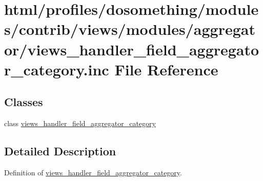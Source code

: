 \hypertarget{views__handler__field__aggregator__category_8inc}{
\section{html/profiles/dosomething/modules/contrib/views/modules/aggregator/views\_\-handler\_\-field\_\-aggregator\_\-category.inc File Reference}
\label{views__handler__field__aggregator__category_8inc}
}
\subsection*{Classes}
\begin{DoxyCompactItemize}
\item 
class \hyperlink{classviews__handler__field__aggregator__category}{views\_\-handler\_\-field\_\-aggregator\_\-category}
\end{DoxyCompactItemize}


\subsection{Detailed Description}
Definition of \hyperlink{classviews__handler__field__aggregator__category}{views\_\-handler\_\-field\_\-aggregator\_\-category}. 